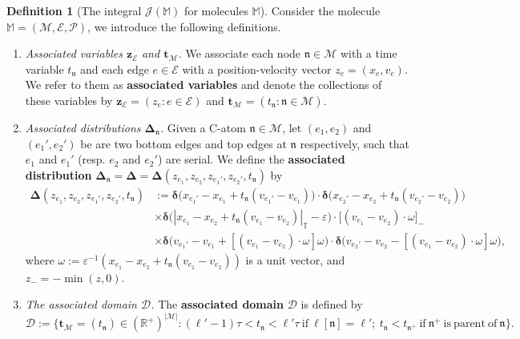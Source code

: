 \documentclass[10pt, reqno]{amsart}
\newcommand{\newterm}[1]{{\textbf{#1}}}
\newcommand{\Dirac}{\boldsymbol{\Delta}}
\newcommand{\Mb}{\mathbb M}
\newcommand{\Tb}{\mathbb T}
\newcommand{\Dc}{\mathcal D}
\newcommand{\Ec}{\mathcal E}
\newcommand {\Jc}{\mathcal J}
\renewcommand{\Mc}{\mathcal M}
\newcommand{\Pc}{\mathcal P}
\newcommand{\nf}{\mathfrak n}
\newcommand{\vz}{\boldsymbol{z}}
\newcommand{\vt}{\boldsymbol{t}}
\theoremstyle{definition}
\newtheorem{definition}[theorem]{Definition}
\theoremstyle{remark}
\numberwithin{equation}{section}
\begin{document}
\begin{definition}[The integral $\Jc(\Mb)$ for molecules $\Mb$]
\label{def.associated_int}
Consider the molecule $\Mb=(\Mc,\Ec,\Pc)$, we introduce the following definitions.
\begin{enumerate}
    \item\label{it.associated_vars} \emph{Associated variables $\vz_\Ec$ and $\vt_\Mc$.} We associate each node $\nf\in \Mc$ with a time variable $t_\nf$ and each edge $e\in \Ec$ with a position-velocity vector $z_e=(x_e,v_e)$. We refer to them as \newterm{associated variables} and denote the collections of these variables by $\vz_\Ec=(z_e:e\in\Ec)$ and $\vt_\Mc=(t_\nf:\nf\in\Mc)$.
    \item\label{it.associated_dist} \emph{Associated distributions $\boldsymbol{\Delta}_\nf$.} Given a C-atom $\nf\in\Mc$, let $(e_1,e_2)$ and $(e_1',e_2')$ be are two bottom edges and top edges at $\nf$ respectively, such that $e_1$ and $e_1'$ (resp. $e_2$ and $e_2'$) are serial. We define the \newterm{associated distribution} $\Dirac_\nf=\boldsymbol{\Delta}=\boldsymbol{\Delta}(z_{e_1},z_{e_2},z_{e_1'},z_{e_2'},t_\nf)$ by
    \begin{equation}\label{eq.associated_dist_C}
        \begin{aligned}
            \boldsymbol{\Delta}(z_{e_1},z_{e_2},z_{e_1'},z_{e_2'},t_\nf)&:=\boldsymbol{\delta}\big(x_{e_1'}-x_{e_1}+t_\nf(v_{e_1'}-v_{e_1})\big)\cdot \boldsymbol{\delta}\big(x_{e_2'}-x_{e_2}+t_\nf(v_{e_2'}-v_{e_2})\big)\\&\times \boldsymbol{\delta}\big(|x_{e_1}-x_{e_2}+t_\nf(v_{e_1}-v_{e_2})|_\Tb-\varepsilon\big)\cdot \big[(v_{e_1}-v_{e_2})\cdot \omega\big]_-\\&\times\boldsymbol{\delta}\big(v_{e_1'}-v_{e_1}+[(v_{e_1}-v_{e_2})\cdot\omega]\omega\big)\cdot\boldsymbol{\delta}\big(v_{e_2'}-v_{e_2}-[(v_{e_1}-v_{e_2})\cdot\omega]\omega\big),
        \end{aligned}
        \end{equation} 
        where $\omega:=\varepsilon^{-1}(x_{e_1}-x_{e_2}+t_\nf(v_{e_1}-v_{e_2}))$ is a unit vector, and $z_-=-\min(z,0)$.
    \item\label{it.associated_domain} \emph{The associated domain $\mathcal{D}$.} The \textbf{associated domain} $\mathcal{D}$ is defined by
    \begin{equation}\label{eq.associated_domain}
        \Dc:=\big\{\vt_\Mc=(t_\nf)\in (\mathbb{R}^+)^{|\Mc|}: (\ell'-1)\tau<t_\nf<\ell'\tau\mathrm{\ if\ }\ell[\nf]=\ell';\ t_{\nf}<t_{\nf^+}\mathrm{\ if\ }\nf^+\mathrm{\ is\ parent\ of\ }\nf \big\}.

\end{equation}
\end{enumerate}
\end{definition}
\end{document}
